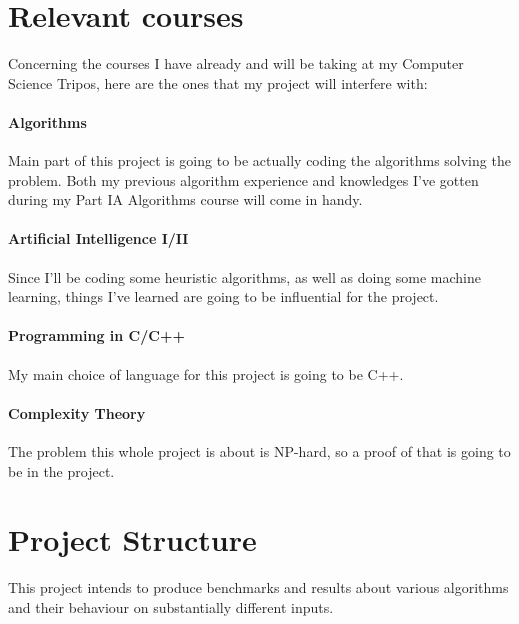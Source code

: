 \section*{Relevant courses}

Concerning the courses I have already and will be taking at my Computer Science Tripos, here are the ones that my project will interfere with:
\paragraph{Algorithms}
Main part of this project is going to be actually coding the algorithms solving the problem. Both my previous algorithm experience and knowledges I've gotten during my Part IA Algorithms course will come in handy.
\paragraph{Artificial Intelligence I/II}
Since I'll be coding some heuristic algorithms, as well as doing some machine learning, things I've learned are going to be influential for the project.
\paragraph{Programming in C/C++}
My main choice of language for this project is going to be C++.
\paragraph{Complexity Theory}
The problem this whole project is about is NP-hard, so a proof of that is going to be in the project.

\section*{Project Structure}
This project intends to produce benchmarks and results about various algorithms and their behaviour on substantially different inputs.

